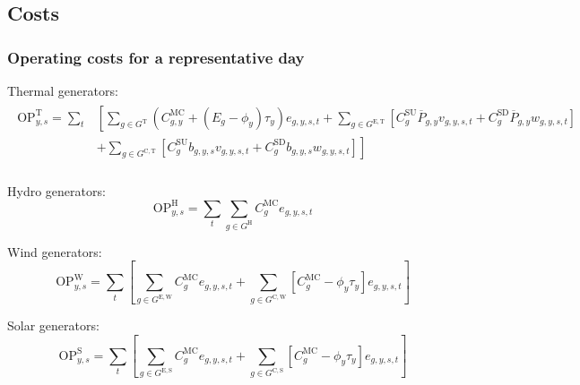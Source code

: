 \documentclass{article}
\newcommand{\sGeneratorsExistingThermal}{G^{\mathrm{E,T}}}
\newcommand{\sGeneratorsExistingWind}{G^{\mathrm{E,W}}}
\newcommand{\sGeneratorsExistingSolar}{G^{\mathrm{E,S}}}
\newcommand{\sGeneratorsCandidateThermal}{G^{\mathrm{C,T}}}
\newcommand{\sGeneratorsCandidateWind}{G^{\mathrm{C,W}}}
\newcommand{\sGeneratorsCandidateSolar}{G^{\mathrm{C,S}}}
\newcommand{\sGeneratorsThermal}{G^{\mathrm{T}}}
\newcommand{\sGeneratorsHydro}{G^{\mathrm{H}}}
\newcommand{\iGenerator}{g}
\newcommand{\iYear}{y}
\newcommand{\iScenario}{s}
\newcommand{\iInterval}{t}
\newcommand{\cOperatingCostThermal}[1][\iYear,\iScenario]{\mathrm{OP}^{\mathrm{T}}_{#1}}
\newcommand{\cOperatingCostHydro}[1][\iYear,\iScenario]{\mathrm{OP}^{\mathrm{H}}_{#1}}
\newcommand{\cOperatingCostWind}[1][\iYear,\iScenario]{\mathrm{OP}^{\mathrm{W}}_{#1}}
\newcommand{\cOperatingCostSolar}[1][\iYear,\iScenario]{\mathrm{OP}^{\mathrm{S}}_{#1}}
\newcommand{\cMarginalCost}[1][\iGenerator,\iYear]{C^{\mathrm{MC}}_{#1}}
\newcommand{\cStartupCost}[1][\iGenerator]{C^{\mathrm{SU}}_{#1}}
\newcommand{\cShutdownCost}[1][\iGenerator]{C^{\mathrm{SD}}_{#1}}
\newcommand{\cEmissionsIntensity}[1][\iGenerator]{E_{#1}}
\newcommand{\cPowerOutputMax}[1][\iGenerator,\iYear]{\overline{P}_{#1}}
\newcommand{\vBaseline}[1][\iYear]{\phi_{#1}}
\newcommand{\vPermitPrice}[1][\iYear]{\tau_{#1}}
\newcommand{\vEnergy}[1][\iGenerator,\iYear,\iScenario,\iInterval]{e_{#1}}
\newcommand{\vStartupIndicator}[1][\iGenerator,\iYear,\iScenario,\iInterval]{v_{#1}}
\newcommand{\vShutdownIndicator}[1][\iGenerator,\iYear,\iScenario,\iInterval]{w_{#1}}
\newcommand{\vInstalledCapacityTotalScenario}[1][\iGenerator,\iYear,\iScenario]{b_{#1}}
\begin{document}
\subsection{Costs}
\subsubsection{Operating costs for a representative day}
Thermal generators:
\begin{align}
\begin{split}
\cOperatingCostThermal = \sum\limits_{\iInterval} & \left[\sum\limits_{\iGenerator \in \sGeneratorsThermal} (\cMarginalCost + (\cEmissionsIntensity - \vBaseline)\vPermitPrice)\vEnergy + \sum\limits_{\iGenerator \in \sGeneratorsExistingThermal} \left[\cStartupCost \cPowerOutputMax \vStartupIndicator + \cShutdownCost \cPowerOutputMax \vShutdownIndicator\right] \right.\\
& \left. + \sum\limits_{\iGenerator \in \sGeneratorsCandidateThermal} \left[\cStartupCost \vInstalledCapacityTotalScenario \vStartupIndicator + \cShutdownCost \vInstalledCapacityTotalScenario \vShutdownIndicator\right] \right]\\
\end{split}
\label{eqn: total thermal generator operating cost}
\end{align}

Hydro generators:
\begin{equation}
\cOperatingCostHydro = \sum\limits_{\iInterval}\sum\limits_{\iGenerator \in \sGeneratorsHydro}\cMarginalCost[\iGenerator] \vEnergy
\end{equation}

Wind generators:
\begin{equation}
\cOperatingCostWind = \sum\limits_{\iInterval}\left[\sum\limits_{\iGenerator \in \sGeneratorsExistingWind} \cMarginalCost[\iGenerator] \vEnergy + \sum\limits_{\iGenerator \in \sGeneratorsCandidateWind} \left[\cMarginalCost[\iGenerator] - \vBaseline \vPermitPrice\right] \vEnergy\right]
\end{equation}

Solar generators:
\begin{equation}
\cOperatingCostSolar = \sum\limits_{\iInterval}\left[\sum\limits_{\iGenerator \in \sGeneratorsExistingSolar} \cMarginalCost[\iGenerator] \vEnergy + \sum\limits_{\iGenerator \in \sGeneratorsCandidateSolar} \left[\cMarginalCost[\iGenerator] - \vBaseline\vPermitPrice\right] \vEnergy\right]
\end{equation}
\end{document}
